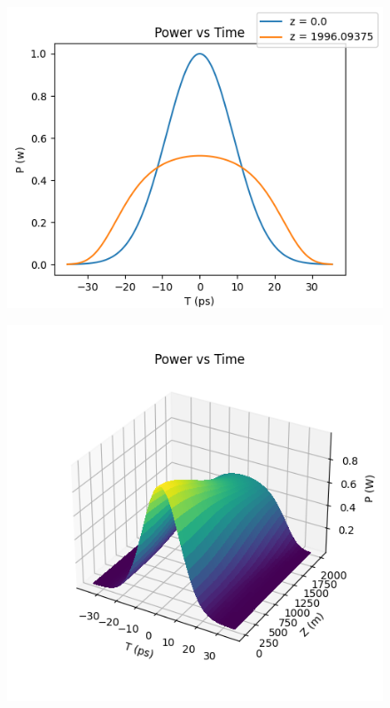 \documentclass[10pt, a4paper, twocolumn]{article} %
\begin{document}
\begin{figure}%
    \includegraphics[width=\linewidth]{plots/plotPowerFL.png}
    \caption{}
    \label{trial1PowerFL}
\end{figure}

\begin{figure}%
    \includegraphics[width=\linewidth]{plots/plotPower3D.png}
    \caption{}
    \label{trial1Power3D}
\end{figure}
\end{document}
